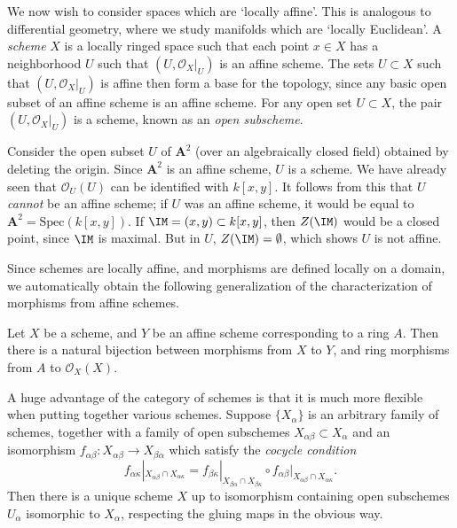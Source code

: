 We now wish to consider spaces which are `locally affine'. This is analogous to differential geometry, where we study manifolds which are `locally Euclidean'. A \emph{scheme} $X$ is a locally ringed space such that each point $x \in X$ has a neighborhood $U$ such that $(U,\mathcal{O}_X|_U)$ is an affine scheme. The sets $U \subset X$ such that $(U,\mathcal{O}_X|_U)$ is affine then form a base for the topology, since any basic open subset of an affine scheme is an affine scheme. For any open set $U \subset X$, the pair $(U,\mathcal{O}_X|_U)$ is a scheme, known as an \emph{open subscheme}.

\begin{example}
    Consider the open subset $U$ of $\mathbf{A}^2$ (over an algebraically closed field) obtained by deleting the origin. Since $\mathbf{A}^2$ is an affine scheme, $U$ is a scheme. We have already seen that $\mathcal{O}_U(U)$ can be identified with $k[x,y]$. It follows from this that $U$ \emph{cannot} be an affine scheme; if $U$ was an affine scheme, it would be equal to $\mathbf{A}^2 = \text{Spec}(k[x,y])$. If $\IM = (x,y) \subset k[x,y]$, then $Z(\IM)$ would be a closed point, since $\IM$ is maximal. But in $U$, $Z(\IM) = \emptyset$, which shows $U$ is not affine.
\end{example}

Since schemes are locally affine, and morphisms are defined locally on a domain, we automatically obtain the following generalization of the characterization of morphisms from affine schemes.

\begin{theorem}
    Let $X$ be a scheme, and $Y$ be an affine scheme corresponding to a ring $A$. Then there is a natural bijection between morphisms from $X$ to $Y$, and ring morphisms from $A$ to $\mathcal{O}_X(X)$.
\end{theorem}

A huge advantage of the category of schemes is that it is much more flexible when putting together various schemes. Suppose $\{ X_\alpha \}$ is an arbitrary family of schemes, together with a family of open subschemes $X_{\alpha\beta} \subset X_\alpha$ and an isomorphism $f_{\alpha \beta}: X_{\alpha \beta} \to X_{\beta \alpha}$ which satisfy the \emph{cocycle condition}
%
\[ f_{\alpha \kappa}|_{X_{\alpha \beta} \cap X_{\alpha \kappa}} = f_{\beta \kappa}|_{X_{\beta \alpha} \cap X_{\beta \kappa}} \circ f_{\alpha \beta}|_{X_{\alpha \beta} \cap X_{\alpha \kappa}}. \]
%
Then there is a unique scheme $X$ up to isomorphism containing open subschemes $U_\alpha$ isomorphic to $X_\alpha$, respecting the gluing maps in the obvious way.

